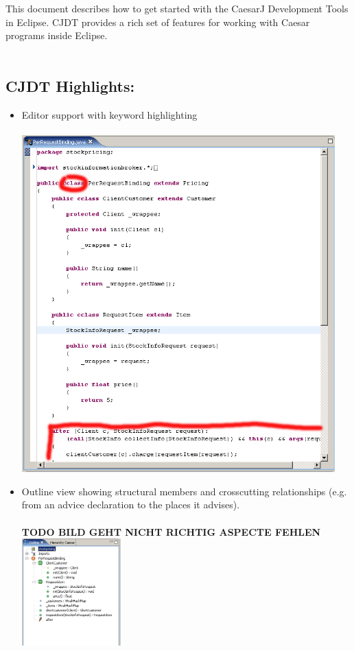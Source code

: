 This document describes how to get started with the CaesarJ Development Tools in Eclipse. CJDT provides a rich set of features for working with Caesar programs inside Eclipse.\\\\
\subsection{CJDT Highlights:}
\begin{itemize}
	\item Editor support with keyword highlighting\\\\
	\includegraphics[width=0.95\textwidth]{images/hilight.png}\\

  \item Outline view showing structural members and crosscutting relationships (e.g. from an advice declaration to
     the places it advises).\\\\
  \textbf{TODO BILD GEHT NICHT RICHTIG ASPECTE FEHLEN}\\
  \includegraphics[width=0.30\textwidth]{images/outline.png}\\
     

\end{itemize}
